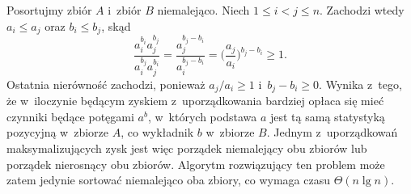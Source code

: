 \exercise %
Posortujmy zbiór $A$ i~zbiór $B$ niemalejąco.
Niech $1\le i<j\le n$.
Zachodzi wtedy $a_i\le a_j$ oraz $b_i\le b_j$, skąd
\[
	\frac{a_i^{b_i}a_j^{b_j}}{a_i^{b_j}a_j^{b_i}} = \frac{a_j^{b_j-b_i}}{a_i^{b_j-b_i}} = \biggl(\frac{a_j}{a_i}\biggr)^{b_j-b_i} \ge 1.
\]
Ostatnia nierówność zachodzi, ponieważ $a_j/a_i\ge1$ i~$b_j-b_i\ge0$.
Wynika z~tego, że w~iloczynie będącym zyskiem z~uporządkowania bardziej opłaca się mieć czynniki będące potęgami $a^b$, w~których podstawa $a$ jest tą samą statystyką pozycyjną w~zbiorze $A$, co wykładnik $b$ w~zbiorze $B$.
Jednym z~uporządkowań maksymalizujących zysk jest więc porządek niemalejący obu zbiorów lub porządek nierosnący obu zbiorów.
Algorytm rozwiązujący ten problem może zatem jedynie sortować niemalejąco oba zbiory, co wymaga czasu $\Theta(n\lg n)$.
